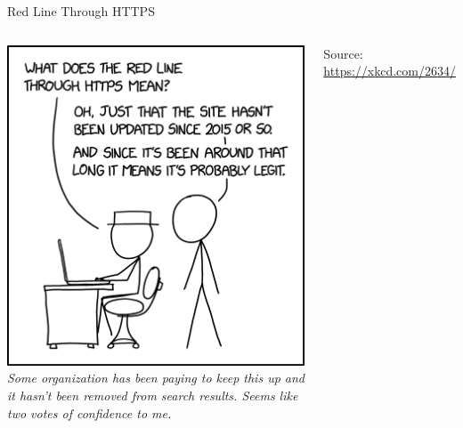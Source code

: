 \newcommand{\rx}[1]{\texttt{"{\color{olive}#1}"}}
\newcommand{\match}[1]{{\color{blue}#1}}
\newcommand{\qtt}[1]{\texttt{"{#1}"}}


\begin{frame}[t,plain]
\titlepage
\end{frame}


\begin{frame}[fragile]{Red Line Through HTTPS}
%
\begin{center}
\begin{columns}
\includegraphics[width=.9\linewidth]{./gfx/21-xkcd-red_line_through_https}
%
\emph{Some organization has been paying to keep this up and it hasn't been removed from search results. Seems like two votes of confidence to me.}

\vspace{6pt}
Source: \url{https://xkcd.com/2634/}

\end{columns}
\end{center}
%
\end{frame}

